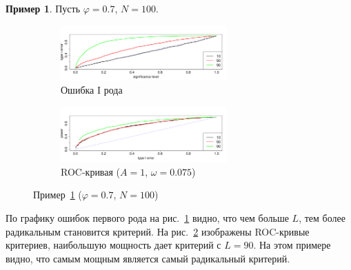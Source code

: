 \documentclass[specialist,
substylefile = spbu.rtx,
               subf,href,colorlinks=true,12pt]{disser}
\theoremstyle{definition}
\newtheorem{example}{Пример}
\begin{document}
\begin{example}\label{example1}
	Пусть $\varphi=0.7$, $N=100$.
	\begin{figure}[h!]
		\captionsetup[subfigure]{justification=Centering}
		\begin{subfigure}[t]{\textwidth}
			\centering
			\includegraphics[width=0.7\textwidth]{img/alphaI_phi7_N100}
			\caption{Ошибка I рода}
			\label{alphaI_phi7_N100}
		\end{subfigure}
		\begin{subfigure}[t]{\textwidth}
			\centering
			\includegraphics[width=0.7\textwidth]{img//roc_phi7_N100}
			\caption{ROC-кривая ($A=1$, $\omega=0.075$)}
			\label{roc_phi7_N100}
		\end{subfigure}
	\label{fig:example1}
	\caption{Пример~\ref{example1} ($\varphi=0.7$, $N=100$)}
	\end{figure}
	По графику ошибок первого рода на рис.~\ref{alphaI_phi7_N100} видно, что чем больше $L$, тем более радикальным становится критерий. На рис.~\ref{roc_phi7_N100} изображены ROC-кривые критериев, наибольшую мощность дает критерий с $L=90$. На этом примере видно, что самым мощным является самый радикальный критерий.
\end{example}
\end{document}

